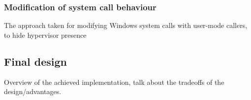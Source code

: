 \subsubsection{Modification of system call behaviour}
The approach taken for modifying Windows system calls with user-mode callers, to hide hypervisor presence
\subsection{Final design}
Overview of the achieved implementation, talk about the tradeoffs of the design/advantages. %



